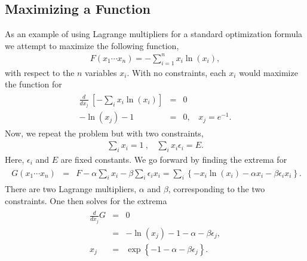 \documentclass[letterpaper,10pt,english]{sphinxmanual}
\begin{document}
\subsection{Maximizing a Function}
\label{\detokenize{chapter1:maximizing-a-function}}
As an example of using Lagrange multipliers for a standard
optimization formula we attempt to maximize the following function,
\begin{equation*}
\begin{split}
F(x_1\cdots x_n)=-\sum_{i=1}^n x_i\ln(x_i),
\end{split}
\end{equation*}
with respect to the \(n\) variables \(x_i\). With no constraints, each
\(x_i\) would maximize the function for
\begin{equation*}
\begin{split}
\begin{eqnarray*}
\frac{d}{dx_j}~\left[-\sum_i x_i\ln(x_i)\right]&=&0\\
-\ln(x_j)-1&=&0,~~~~x_j=e^{-1}.
\end{eqnarray*}
\end{split}
\end{equation*}
Now, we repeat the problem but with two constraints,
\begin{equation*}
\begin{split}
\sum_ix_i=1~,~~~~\sum_ix_i\epsilon_i=E.
\end{split}
\end{equation*}
Here, \(\epsilon_i\) and \(E\) are fixed constants. We go forward by
finding the extrema for
\begin{equation*}
\begin{split}
\begin{eqnarray*}
G(x_1\cdots x_n)&=&F-\alpha\sum_i x_i-\beta\sum_i\epsilon_ix_i
=\sum_i \left\{-x_i\ln(x_i)-\alpha x_i-\beta\epsilon_ix_i\right\}.
\end{eqnarray*}
\end{split}
\end{equation*}
There are two Lagrange multipliers, \(\alpha\) and \(\beta\),
corresponding to the two constraints. One then solves for the extrema
\begin{equation*}
\begin{split}
\begin{eqnarray*}
\frac{d}{dx_j}G&=&0\\
&=&-\ln(x_j)-1-\alpha-\beta\epsilon_j,\\
x_j&=&\exp\left\{-1-\alpha-\beta\epsilon_j\right\}.
\end{eqnarray*}
\end{split}
\end{equation*}
\end{document}
